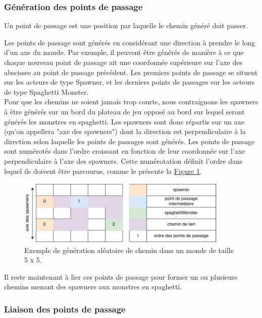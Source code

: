 \documentclass{article}
\begin{document}
\subsubsection{Génération des points de passage}
Un point de passage est une position par laquelle le chemin généré doit passer.

Les points de passage sont générés en considérant une direction à prendre le long d'un axe du monde. Par exemple, il peuvent être générés de manière à ce que chaque nouveau point de passage ait une coordonnée supérieure sur l'axe des abscisses au point de passage précédent.
Les premiers points de passage se situent sur les acteurs de type Spawner, et les derniers points de passages sur les acteurs de type Spaghetti Monster.\\
Pour que les chemins ne soient jamais trop courts, nous contraignons les spawners à être générés sur un bord du plateau de jeu opposé au bord sur lequel seront générés les monstres en spaghetti.
Les spawners sont donc répartis sur un axe (qu'on appellera "axe des spawners") dont la direction est perpendiculaire à la direction selon laquelle les points de passages sont générés. Les points de passage sont numérotés dans l'ordre croissant en fonction de leur coordonnée sur l'axe perpendiculaire à l'axe des spawners. Cette numérotation définit l'ordre dans lequel ils doivent être parcourus, comme le présente la \hyperref[fig:points de passage]{Figure \ref{fig:points de passage}}.

\begin{figure}[H]
    \centering
    \includegraphics[width = 0.9\textwidth]{points_de_passage.png}
    \caption{Exemple de génération aléatoire de chemin dans un monde de taille 5 x 5.}
    \label{fig:points de passage}
\end{figure}

Il reste maintenant à lier ces points de passage pour former un ou plusieurs chemins menant des spawners aux monstres en spaghetti.

\subsubsection{Liaison des points de passage}
\end{document}
